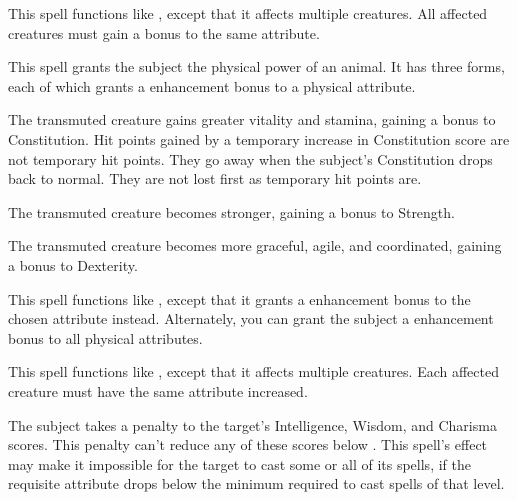 \spelleffect This spell functions like , except that it affects multiple creatures. All affected creatures must gain a bonus to the same attribute.

\spelldur{\durshort}
\spelleffect This spell grants the subject the physical power of an animal. It has three forms, each of which grants a  enhancement bonus to a physical attribute.
\par {} The transmuted creature gains greater vitality and stamina, gaining a bonus to Constitution. Hit points gained by a temporary increase in Constitution score are not temporary hit points. They go away when the subject's Constitution drops back to normal. They are not lost first as temporary hit points are.
\par {} The transmuted creature becomes stronger, gaining a bonus to Strength.
\par {} The transmuted creature becomes more graceful, agile, and coordinated, gaining a bonus to Dexterity.

\spelleffect This spell functions like , except that it grants a  enhancement bonus to the chosen attribute instead. Alternately, you can grant the subject a  enhancement bonus to all physical attributes.

\spelleffect This spell functions like , except that it affects multiple creatures. Each affected creature must have the same attribute increased. 

\spelldur{\durshort}
\spelleffect The subject takes a  penalty to the target's Intelligence, Wisdom, and Charisma scores. This penalty can't reduce any of these scores below .
\spellnotes This spell's effect may make it impossible for the target to cast some or all of its spells, if the requisite attribute drops below the minimum required to cast spells of that level.

